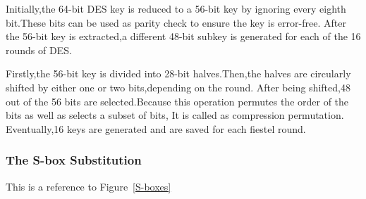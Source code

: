 \documentclass[11pt]{article}
\begin{document}
\qquad\quad Initially,the 64-bit DES key is reduced to a 56-bit key by ignoring every eighth bit.These bits can be used as parity check to ensure the key is error-free.
  After the 56-bit key is extracted,a different 48-bit subkey is generated for each of the 16 rounds of DES.
  
\quad\quad Firstly,the 56-bit key is divided into 28-bit halves.Then,the halves are circularly shifted by either one or two bits,depending on the round.
  After being shifted,48 out of the 56 bits are selected.Because this operation permutes the order of the bits as well as selects a subset of bits,
  It is called as compression permutation.\\
  Eventually,16 keys are generated and are saved for each fiestel round.

 
\subsubsection{The S-box Substitution}
This is a reference to Figure~\ref{S-boxes} \cite{source4}
\end{document}
